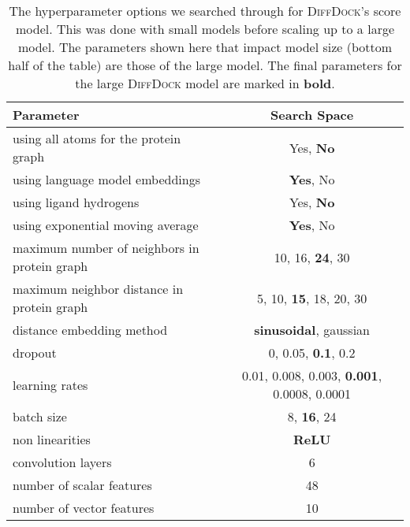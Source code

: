 \documentclass{article} \usepackage{iclr2023_conference,times}
\begin{document}
\begin{table}[htpb]
\caption[SearchSpace]{The hyperparameter options we searched through for \textsc{DiffDock}'s score model. This was done with small models before scaling up to a large model. The parameters shown here that impact model size (bottom half of the table) are those of the large model. The final parameters for the large \textsc{DiffDock} model are marked in \textbf{bold}.}
\label{tab:hyperparameters}
\begin{center}
\begin{small}
\begin{sc}
\begin{tabular}{lc}
\toprule
Parameter & Search Space  \\    
\midrule
using all atoms for the protein graph & Yes, \textbf{No}\\
using language model embeddings & \textbf{Yes}, No\\
using ligand hydrogens & Yes, \textbf{No}\\
using exponential moving average & \textbf{Yes}, {No}\\
maximum number of neighbors in protein graph & 10, 16, \textbf{24}, 30\\
maximum neighbor distance in protein graph & 5, 10, \textbf{15}, 18, 20, 30\\
distance embedding method & \textbf{sinusoidal}, gaussian \\
dropout & 0, 0.05, \textbf{0.1}, 0.2 \\
learning rates & 0.01, 0.008, 0.003, \textbf{0.001}, 0.0008, 0.0001\\
batch size & 8, \textbf{16}, 24\\
non linearities & \textbf{ReLU} \\
\midrule
convolution layers & 6 \\
number of scalar features &  48 \\
number of vector features &  10 \\
\bottomrule
\end{tabular}
\end{sc}
\end{small}
\end{center}
\vskip -0.1in
\end{table}
\end{document}
